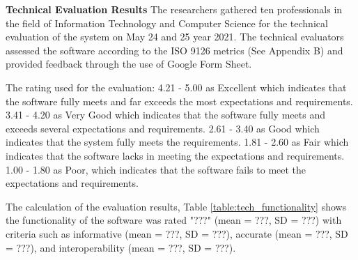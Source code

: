 \textbf{Technical Evaluation Results}
\justifying
\parx
The researchers gathered ten professionals in the field of Information
Technology and Computer Science for the technical evaluation of the system on
May 24 and 25 year 2021. The technical evaluators assessed the software
according to the ISO 9126 metrics (See Appendix B) and provided feedback
through the use of Google Form Sheet.

\parx
The rating used for the evaluation: 4.21 - 5.00 as Excellent which indicates that the
software fully meets and far exceeds the most expectations and requirements.
3.41 - 4.20 as Very Good which indicates that the software fully meets and exceeds
several expectations and requirements. 2.61 - 3.40 as Good which indicates that the
system fully meets the requirements. 1.81 - 2.60 as Fair which indicates that the software
lacks in meeting the expectations and requirements. 1.00 - 1.80 as Poor, which
indicates that the software fails to meet the expectations and requirements.

\parx
The calculation of the evaluation results, Table \ref{table:tech_functionality} shows the
functionality of the software was rated "???" (mean = ???, SD = ???) with criteria
such as informative (mean = ???, SD = ???), accurate (mean = ???, SD = ???),
and interoperability (mean = ???, SD = ???).

